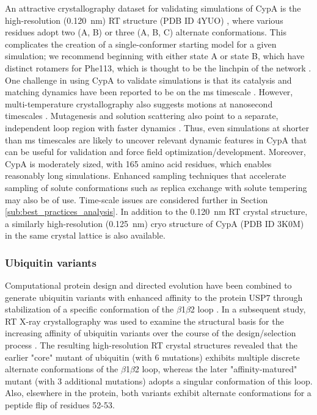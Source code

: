 \documentclass[9pt,review]{livecoms}
\begin{document}
An attractive crystallography dataset for validating simulations of CypA is the high-resolution (\qty{0.120}{\nano\meter}) RT structure (PDB ID 4YUO) \cite{keedy_mapping_2015}, where various residues adopt two (A, B) or three (A, B, C) alternate conformations.
This complicates the creation of a single-conformer starting model for a given simulation; we recommend beginning with either state A or state B, which have distinct rotamers for Phe113, which is thought to be the linchpin of the network \cite{keedy_mapping_2015}.
One challenge in using CypA to validate simulations is that its catalysis and matching dynamics have been reported to be on the ms timescale \cite{eisenmesser_intrinsic_2005}.
However, multi-temperature crystallography also suggests motions at nanosecond timescales \cite{keedy_mapping_2015}.
Mutagenesis and solution scattering also point to a separate, independent loop region with faster dynamics \cite{thompson_temperature-jump_2019}.
Thus, even simulations at shorter than ms timescales are likely to uncover relevant dynamic features in CypA that can be useful for validation and force field optimization/development.
Moreover, CypA is moderately sized, with 165 amino acid residues, which enables reasonably long simulations.
Enhanced sampling techniques \cite{henin_enhanced_2022} that accelerate sampling of solute conformations such as replica exchange with solute tempering \cite{wang_replica_2011} may also be of use.
Time-scale issues are considered further in Section \ref{sub:best_practices_analysis}.
In addition to the \qty{0.120}{\nano\meter} RT crystal structure, a similarly high-resolution (\qty{0.125}{\nano\meter}) cryo structure of CypA (PDB ID 3K0M) \cite{fraser_hidden_2009} in the same crystal lattice is also available.

\subsubsection{Ubiquitin variants}
\label{sub2:ubiquitin}

Computational protein design and directed evolution have been combined to generate ubiquitin variants with enhanced affinity to the protein USP7 through stabilization of a specific conformation of the $\beta$1$\beta$2 loop \cite{zhang_conformational_2013}.
In a subsequent study, RT X-ray crystallography was used to examine the structural basis for the increasing affinity of ubiquitin variants over the course of the design/selection process \cite{biel_flexibility_2017}.
The resulting high-resolution RT crystal structures revealed that the earlier "core" mutant of ubiquitin (with 6 mutations) exhibits multiple discrete alternate conformations of the $\beta$1$\beta$2 loop, whereas the later "affinity-matured" mutant (with 3 additional mutations) adopts a singular conformation of this loop.
Also, elsewhere in the protein, both variants exhibit alternate conformations for a peptide flip of residues 52-53.
\end{document}
